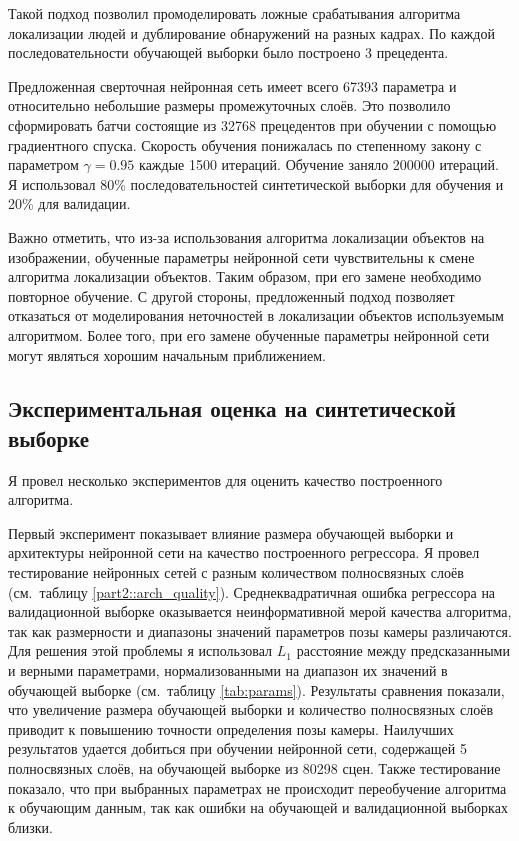 Такой подход позволил промоделировать ложные срабатывания алгоритма локализации людей и дублирование обнаружений на разных кадрах. По каждой последовательности обучающей выборки было построено 3 прецедента.

Предложенная сверточная нейронная сеть имеет всего 67393 параметра и относительно небольшие размеры промежуточных слоёв. Это позволило сформировать батчи состоящие из 32768 прецедентов при обучении с помощью градиентного спуска. Скорость обучения понижалась по степенному закону с параметром $\gamma=0.95$ каждые 1500 итераций. Обучение заняло 200000 итераций. Я использовал 80\% последовательностей синтетической выборки для обучения и 20\% для валидации.

Важно отметить, что из-за использования алгоритма локализации объектов на изображении, обученные параметры нейронной сети чувствительны к смене алгоритма локализации объектов. Таким образом, при его замене необходимо повторное обучение.  С другой стороны, предложенный подход позволяет отказаться от моделирования неточностей в локализации объектов используемым алгоритмом. Более того, при его замене обученные параметры нейронной сети могут являться хорошим начальным приближением.

\subsection{Экспериментальная оценка на синтетической выборке}

Я провел несколько экспериментов для оценить качество построенного алгоритма. 

Первый эксперимент показывает влияние размера обучающей выборки и архитектуры нейронной сети на качество построенного регрессора. Я провел тестирование нейронных сетей с разным количеством полносвязных слоёв (см.~таблицу \ref{part2::arch_quality}). Среднеквадратичная ошибка регрессора на валидационной выборке оказывается неинформативной мерой качества алгоритма, так как размерности и диапазоны значений параметров позы камеры различаются. Для решения этой проблемы я использовал $L_1$ расстояние между предсказанными и верными параметрами, нормализованными на диапазон их значений в обучающей выборке (см.~таблицу \ref{tab:params}). Результаты сравнения показали, что увеличение размера обучающей выборки и количество полносвязных слоёв приводит к повышению точности определения позы камеры. Наилучших результатов удается добиться при обучении нейронной сети, содержащей 5 полносвязных слоёв, на обучающей выборке из 80298 сцен. Также тестирование показало, что при выбранных параметрах не происходит переобучение алгоритма к обучающим данным, так как ошибки на обучающей и валидационной выборках близки.


